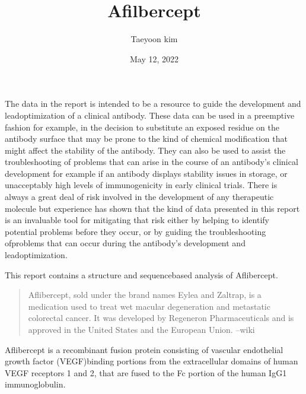 \documentclass[letterpaper,10pt,english]{jupyterBook}
\title{Afilbercept}
\date{May 12, 2022}
\author{Taeyoon kim}
\begin{document}
\pagestyle{empty}
\sphinxmaketitle
\pagestyle{plain}
\sphinxtableofcontents
\pagestyle{normal}
\label{\detokenize{intro::doc}}


\sphinxAtStartPar
The data in the report is intended to be a resource to guide the development and lead\sphinxhyphen{}optimization of a clinical antibody. These data can be used in a preemptive fashion \sphinxhyphen{} for example, in the decision to substitute an exposed residue on the antibody surface that may be prone to the kind of chemical modification that might affect the stability of the antibody. They can also be used to assist the troubleshooting of problems that can arise in the course of an antibody’s clinical development \sphinxhyphen{} for example if an antibody displays stability issues in storage, or unacceptably high levels of immunogenicity in early clinical trials. There is always a great deal of risk involved in the development of any therapeutic molecule but experience has shown that the kind of data presented in this report is an invaluable tool for mitigating that risk \sphinxhyphen{} either by helping to identify potential problems before they occur, or by guiding the troubleshooting ofproblems that can occur during the antibody’s development and lead\sphinxhyphen{}optimization.

\begin{DUlineblock}{0em}
\item[] 
\end{DUlineblock}

\sphinxAtStartPar
This report contains a structure and sequence\sphinxhyphen{}based analysis of Aflibercept.
\begin{quote}

\sphinxAtStartPar
Aflibercept, sold under the brand names Eylea and Zaltrap, is a medication used to treat wet macular degeneration and metastatic colorectal cancer. It was developed by Regeneron Pharmaceuticals and is approved in the United States and the European Union. –wiki
\end{quote}

\sphinxAtStartPar
Aflibercept is a recombinant fusion protein consisting of vascular endothelial growth factor (VEGF)\sphinxhyphen{}binding portions from the extracellular domains of human VEGF receptors 1 and 2, that are fused to the Fc portion of the human IgG1 immunoglobulin.

\begin{DUlineblock}{0em}
\item[] 
\end{DUlineblock}
\end{document}
